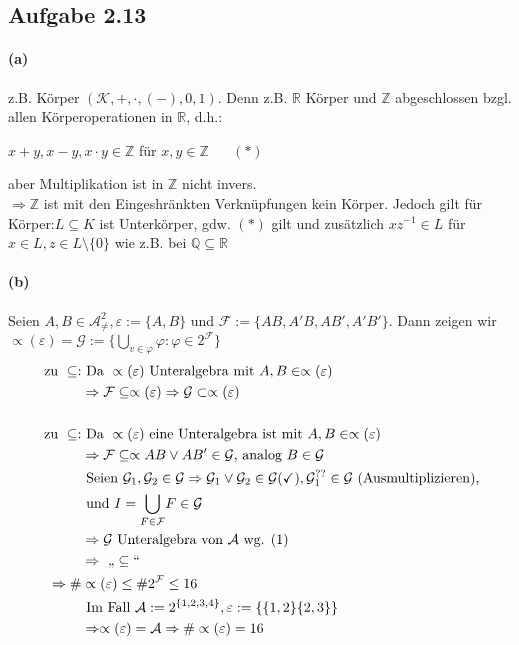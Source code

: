 \documentclass[10pt, a4paper]{article}
\begin{document}
\subsection{Aufgabe 2.13}
\paragraph*{(a)}
z.B. Körper $(\mathcal{K}, +,\cdot,(-),0,1).$
Denn z.B. $\mathbb{R}$ Körper und $\mathbb{Z}$ abgeschlossen bzgl. allen Körperoperationen in $\mathbb{R}$, d.h.:
\begin{center}
	$x+y,x-y,x\cdot y\in\mathbb{Z}$ für $x,y\in\mathbb{Z}\hspace{20pt}(\ast)$
\end{center}
aber Multiplikation ist in $\mathbb{Z}$ nicht invers.\vspace{5pt}	\\
$\Rightarrow\mathbb{Z}$ ist mit den Eingeshränkten Verknüpfungen kein Körper. Jedoch gilt für Körper:$L\subseteq K$ ist Unterkörper, gdw. $(\ast)$ gilt und zusätzlich $xz^{-1}\in L$ für $x\in L, z\in L\setminus\{0\}$ wie z.B. bei $\mathbb{Q\subseteq\mathbb{R}}$


\paragraph*{(b)}
Seien $A,B\in\mathcal{A}^{2}_{\neq}, \varepsilon:=\{A,B\}$ und $\mathcal{F}:=\{AB,A'B,AB',A'B'\}$. Dann zeigen wir $\propto(\varepsilon)=\mathcal{G}:=\{\underset{v\in\varphi}{\bigcup}\varphi:\varphi\in2^{\mathcal{F}}\}$
\begin{align*}
	\text{ zu }\subseteq:& \text{ Da }\propto(\varepsilon)\text{ Unteralgebra mit } A,B\in\propto(\varepsilon)	\\
	&\Rightarrow\mathcal{F}\subseteq\propto(\varepsilon)\Rightarrow\mathcal{G}\subset\propto(\varepsilon)	\\
	\\
	\text{ zu }\subseteq:& \text{ Da }\propto(\varepsilon) \text{ eine Unteralgebra ist mit } A,B\in\propto(\varepsilon)	\\
	&\Rightarrow\mathcal{F}\subseteq\propto AB\vee AB'\in\mathcal{G}\text{, analog }B\in\mathcal{G}	\\
	&\text{ Seien }\mathcal{G}_{1},\mathcal{G}_{2}\in\mathcal{G}\Rightarrow\mathcal{G}_{1}\vee\mathcal{G}_{2}\in\mathcal{G}(\text{\checkmark}), \mathcal{G}_{1}^{??}\in\mathcal{G}\text{ (Ausmultiplizieren),}	\\
	&\text{ und } I=\underset{F\in\mathcal{F}}{\bigcup}F\in\mathcal{G}	\\
	&\Rightarrow\mathcal{G}\text{ Unteralgebra von }\mathcal{A}\text{ wg. }(1)	\\
	&\Rightarrow\text{ „}\subseteq\text{“}	\\
	\Rightarrow\#&\propto(\varepsilon)\leq\#2^{\mathcal{F}}\leq16	\\
	&\text{ Im Fall }\mathcal{A}:=2^{\{1,2,3,4\}}, \varepsilon:=\{\{1,2\}\{2,3\}\}	\\ 
	&\Rightarrow\propto(\varepsilon)=\mathcal{A}\Rightarrow\#\propto(\varepsilon)=16	\\
\end{align*}
\end{document}
